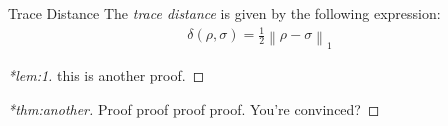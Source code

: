 \documentclass[12pt,a5paper]{article}
\begin{document}
\begin{thmheading}{Trace Distance}
  \label{thmheading:trace-dist}
  The \emph{trace distance} is given by the following expression:
  \begin{align}
    \delta(\rho,\sigma) = \frac12 \left\lVert \rho - \sigma \right\rVert_1
  \end{align}
\end{thmheading}

\cleardoublepage

\begin{proof}[*lem:1]
  this is another proof.
\end{proof}

\cleardoublepage

\begin{proof}[*thm:another]
  Proof proof proof proof. You're convinced?
\end{proof}
\end{document}
